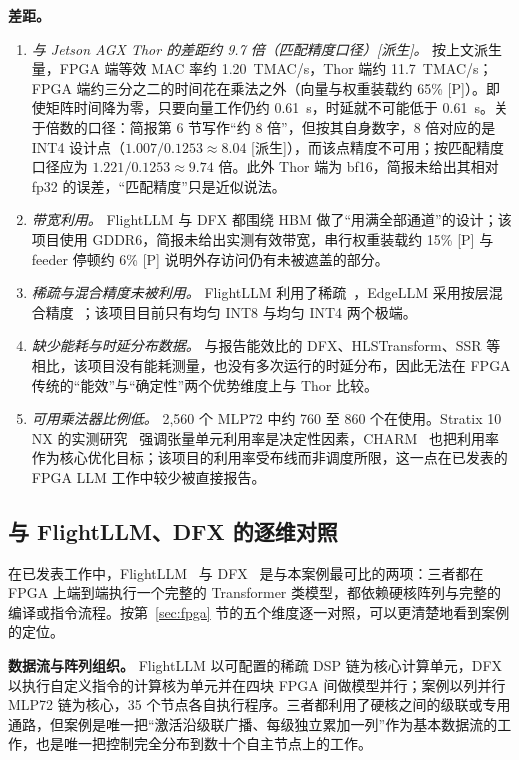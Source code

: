 \documentclass[a4paper,10.5pt]{ctexart}
\newcommand{\tP}{\textsf{[P]}}              %
\newcommand{\tD}{\textsf{[派生]}}           %
\begin{document}
\textbf{差距。}
\begin{enumerate}
  \item \emph{与 Jetson AGX Thor 的差距约 9.7 倍（匹配精度口径）\tD。} 按上文派生量，FPGA 端等效 MAC 率约 1.20~TMAC/s，Thor 端约 11.7~TMAC/s；FPGA 端约三分之二的时间花在乘法之外（向量与权重装载约 65\% \tP）。即使矩阵时间降为零，只要向量工作仍约 0.61~s，时延就不可能低于 0.61~s。关于倍数的口径：简报第 6 节写作“约 8 倍”，但按其自身数字，8 倍对应的是 INT4 设计点（$1.007/0.1253\approx8.04$ \tD），而该点精度不可用；按匹配精度口径应为 $1.221/0.1253\approx9.74$ 倍。此外 Thor 端为 bf16，简报未给出其相对 fp32 的误差，“匹配精度”只是近似说法。
  \item \emph{带宽利用。} FlightLLM 与 DFX 都围绕 HBM 做了“用满全部通道”的设计；该项目使用 GDDR6，简报未给出实测有效带宽，串行权重装载约 15\% \tP{} 与 feeder 停顿约 6\% \tP{} 说明外存访问仍有未被遮盖的部分。
  \item \emph{稀疏与混合精度未被利用。} FlightLLM 利用了稀疏~\cite{flightllm}，EdgeLLM 采用按层混合精度~\cite{edgellm}；该项目目前只有均匀 INT8 与均匀 INT4 两个极端。
  \item \emph{缺少能耗与时延分布数据。} 与报告能效比的 DFX、HLSTransform、SSR 等相比，该项目没有能耗测量，也没有多次运行的时延分布，因此无法在 FPGA 传统的“能效”与“确定性”两个优势维度上与 Thor 比较。
  \item \emph{可用乘法器比例低。} 2,560 个 MLP72 中约 760 至 860 个在使用。Stratix 10 NX 的实测研究~\cite{s10nx_fpt} 强调张量单元利用率是决定性因素，CHARM~\cite{charm} 也把利用率作为核心优化目标；该项目的利用率受布线而非调度所限，这一点在已发表的 FPGA LLM 工作中较少被直接报告。
\end{enumerate}

\subsection{与 FlightLLM、DFX 的逐维对照}\label{sec:vsflight}

在已发表工作中，FlightLLM~\cite{flightllm} 与 DFX~\cite{dfx} 是与本案例最可比的两项：三者都在 FPGA 上端到端执行一个完整的 Transformer 类模型，都依赖硬核阵列与完整的编译或指令流程。按第~\ref{sec:fpga} 节的五个维度逐一对照，可以更清楚地看到案例的定位。

\textbf{数据流与阵列组织。} FlightLLM 以可配置的稀疏 DSP 链为核心计算单元，DFX 以执行自定义指令的计算核为单元并在四块 FPGA 间做模型并行；案例以列并行 MLP72 链为核心，35 个节点各自执行程序。三者都利用了硬核之间的级联或专用通路，但案例是唯一把“激活沿级联广播、每级独立累加一列”作为基本数据流的工作，也是唯一把控制完全分布到数十个自主节点上的工作。
\end{document}
